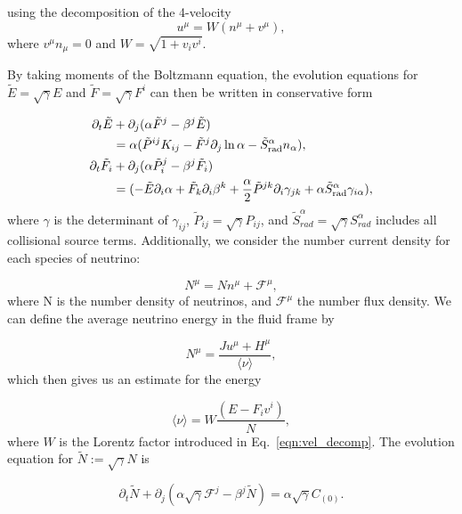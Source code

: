 using the decomposition of the 4-velocity
%
\begin{equation}
  \label{eqn:vel_decomp}
  u^\mu = W(n^\mu + v^\mu),
\end{equation}
%
where $v^\mu n_\mu = 0$ and $W = \sqrt{1 + v_i v^i}$.

By taking moments of the Boltzmann equation, the evolution equations for $\tilde E = \sqrt{\gamma}E$ and $\tilde F = \sqrt{\gamma} F^i$ can then be written in conservative form

\begin{align}
  \partial_t \tilde E &+ \partial_j (\alpha \tilde F^j - \beta^j \tilde E) \\
  &= \alpha(\tilde P^{ij} K_{ij} - \tilde F^j \partial_j \ln \alpha - \tilde S_\text{rad}^\alpha n_\alpha), \notag\\
  \partial_t \tilde F_i &+ \partial_j (\alpha \tilde P_i^j - \beta^j \tilde F_i) \\
  &= (-\tilde{E} \partial_i \alpha + \tilde{F}_k \partial_i \beta^k + \frac{\alpha}{2} \tilde{P}^{jk} \partial_i \gamma_{jk} + \alpha \tilde{S}_{\text{rad}}^\alpha \gamma_{i\alpha}) \notag,
\end{align}
%
where $\gamma$ is the determinant of $\gamma_{ij}$, $\tilde{P}_{ij} = \sqrt{\gamma}P_{ij}$, and $\tilde{S}_{rad}^\alpha = \sqrt{\gamma} S_{rad}^\alpha$ includes all collisional source terms. Additionally, we consider the number current density for each species of neutrino:

\begin{equation}
  N^\mu = Nn^\mu + \mathcal{F}^\mu,
\end{equation}
%
where N is the number density of neutrinos, and $\mathcal{F}^\mu$ the number flux density. We can define the average neutrino energy in the fluid frame by

\begin{equation}
  N^\mu = \frac{Ju^\mu + H^\mu}{\langle \nu \rangle}, 
\end{equation}
%
which then gives us an estimate for the energy

\begin{equation}
\langle \nu \rangle = W\frac{(E-F_iv^i)}{N},
\end{equation}
%
where $W$ is the Lorentz factor introduced in Eq.~\ref{eqn:vel_decomp}. The evolution equation for $\tilde{N} := \sqrt{\gamma}N$ is

\begin{equation}
  \partial_t \tilde N + \partial_j(\alpha \sqrt{\gamma} \mathcal{F}^j - \beta^j \tilde N) = \alpha \sqrt{\gamma} C_{(0)}.
\end{equation}

